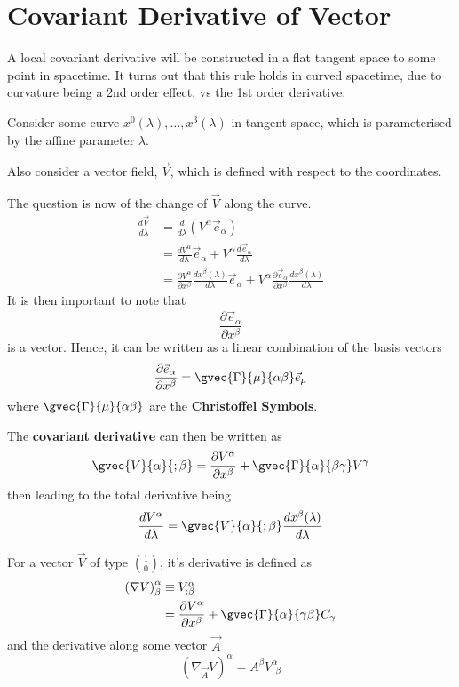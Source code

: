 \section{Covariant Derivative of Vector}
A local covariant derivative will be constructed in a flat tangent space to some point in spacetime. It turns out that this rule holds in curved spacetime, due to curvature being a 2nd order effect, vs the 1st order derivative. \par Consider some curve $x^0(\lambda), \dots, x^3(\lambda)$ in tangent space, which is parameterised by the affine parameter $\lambda$. \par Also consider a vector field, $\vec{V}$, which is defined with respect to the coordinates. \par The question is now of the change of $\vec{V}$ along the curve.
\begin{align*}
    \frac{d\vec{V}}{d\lambda} & = \frac{d}{d\lambda} (V^\alpha \vec{e}_\alpha) \\ 
    & = \frac{dV^\alpha}{d\lambda} \vec{e}_\alpha + V^\alpha \frac{d \vec{e}_\alpha}{d\lambda} \\
    & = \frac{\partial V^\alpha}{\partial x^\beta} \frac{d x^\beta (\lambda)}{d\lambda} \vec{e}_\alpha + V^\alpha \frac{\partial \vec{e}_\alpha}{\partial x^\beta} \frac{dx^\beta (\lambda)}{d\lambda}
\end{align*}
It is then important to note that
$$ \frac{\partial \vec{e}_\alpha}{\partial x^\beta} $$
is a vector. Hence, it can be written as a linear combination of the basis vectors
$$ \frac{\partial \vec{e}_\alpha}{\partial x^\beta} = \gvec{\Gamma}{\mu}{\alpha \beta} \vec{e}_\mu $$
where $\gvec{\Gamma}{\mu}{\alpha \beta}$ are the \textbf{Christoffel Symbols}.
\par The \textbf{covariant derivative} can then be written as 
$$ \gvec{V}{\alpha}{; \beta} = \frac{\partial V^\alpha}{\partial x^\beta} + \gvec{\Gamma}{\alpha}{\beta \gamma} V^\gamma $$
then leading to the total derivative being
$$ \frac{dV^\alpha}{d\lambda} = \gvec{V}{\alpha}{; \beta} \frac{dx^\beta(\lambda)}{d\lambda} $$

\begin{definition}
    For a vector $\vec{V}$ of type $\binom{1}{0}$, it's derivative is defined as
    \begin{align*}
        \left( \nabla V \right)^\alpha_{\beta} & \equiv V^\alpha_{;\beta} \\
        & = \frac{\partial V^\alpha}{\partial x^\beta} + \gvec{\Gamma}{\alpha}{\gamma \beta} C_\gamma
    \end{align*}
    and the derivative along some vector $\vec{A}$
    $$ \left( \nabla_{\vec{A}} V \right)^{\alpha} = A^\beta V^\alpha_{;\beta} $$
\end{definition}
